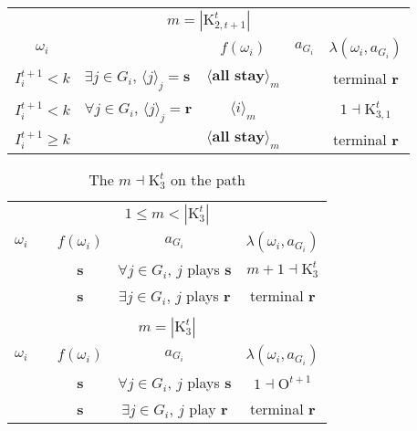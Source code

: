 \documentclass[12pt,letter]{article}
\newcommand{\Kappa}{\mathrm{K}}
\newcommand{\Omicron}{\mathrm{O}}
\theoremstyle{definition}
\theoremstyle{remark}
\theoremstyle{claim}
\begin{document}
\begin{table}[!htbp]
\begin{center}
\begin{tabular}{c l | c | c | c}
\\
\multicolumn{5}{c}{$m= |\Kappa^t_{2,t+1}|$}\\
$\omega_i$ 	 & 	   &	$f(\omega_i)$  &	$a_{G_i}$ & $\lambda(\omega_i,a_{G_i})$ \\
\hline
\hline
$I^{t+1}_i< k$  	& 	$\exists j\in G_i$, $\langle j \rangle_j=\textbf{s}$	& $\langle \textbf{all stay} \rangle_m$		&  	& terminal \textbf{r}\\
$I^{t+1}_i< k$  	& 	$\forall j\in G_i$, $\langle j \rangle_j=\textbf{r}$	& $\langle i \rangle_m$		&  	& $1\dashv \Kappa^t_{3,1}$\\
$I^{t+1}_i\geq k$	 & 				& $\langle \textbf{all stay} \rangle_m$ 	& 		& terminal \textbf{r}\\
\hline
\end{tabular}
\end{center}
\end{table}




\clearpage









\begin{table}[!htbp]
\caption{The $m\dashv\Kappa^t_{3}$ on the path}
\label{table:eqm_path_kt3}
\begin{center}
\begin{tabular}{c c | c | c | c}
\multicolumn{5}{c}{$1\leq m < |\Kappa^t_3|$}\\
$\omega_i$ 	 & 	   &	$f(\omega_i)$  &	$a_{G_i}$ & $\lambda(\omega_i,a_{G_i})$ \\
\hline
\hline
  	&	& \textbf{s} & $\forall j\in G_i$, $j$ plays $\textbf{s}$ 	& $m+1\dashv \Kappa^t_{3}$\\
  	&  & \textbf{s}  &  $\exists j\in G_i$, $j$ plays $\textbf{r}$  	& terminal \textbf{r}\\
\hline
\\
\multicolumn{5}{c}{$m= |\Kappa^t_3|$}\\
$\omega_i$ 	 & 	   &	$f(\omega_i)$  &	$a_{G_i}$ & $\lambda(\omega_i,a_{G_i})$ \\
\hline
\hline
 	& 	& \textbf{s} & $\forall j\in G_i$, $j$ plays $\textbf{s}$ 	& $1\dashv \Omicron^{t+1}$\\
  	&  & \textbf{s}  &  $\exists j\in G_i$, $j$ play $\textbf{r}$  	& terminal \textbf{r}\\
\hline
\end{tabular}
\end{center}
\end{table}
\end{document}
